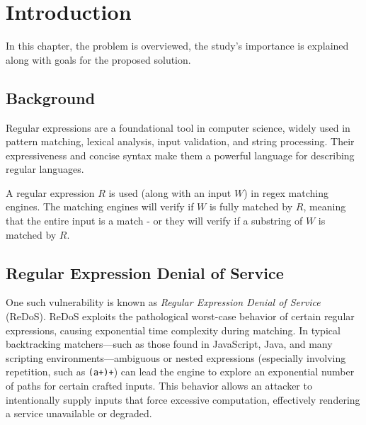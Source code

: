 \chapter{Introduction}\label{chap:intro}


In this chapter, the problem is overviewed, the study's importance is explained along with goals for the proposed solution. 

\section{Background}
Regular expressions are a foundational tool in computer science, widely used in pattern matching, lexical analysis, input validation, and string processing. Their expressiveness and concise syntax make them a powerful language for describing regular languages.


A regular expression $R$ is used (along with an input $W$) in regex matching engines. The matching engines will verify if $W$ is fully matched by $R$, meaning that the entire input is a match - or they will verify if a substring of $W$ is matched by $R$. 


\section{Regular Expression Denial of Service}
One such vulnerability is known as \emph{Regular Expression Denial of Service} (ReDoS). ReDoS exploits the pathological worst-case behavior of certain regular expressions, causing exponential time complexity during matching. In typical backtracking matchers---such as those found in JavaScript, Java, and many scripting environments---ambiguous or nested expressions (especially involving repetition, such as \texttt{(a+)+}) can lead the engine to explore an exponential number of paths for certain crafted inputs. This behavior allows an attacker to intentionally supply inputs that force excessive computation, effectively rendering a service unavailable or degraded.

